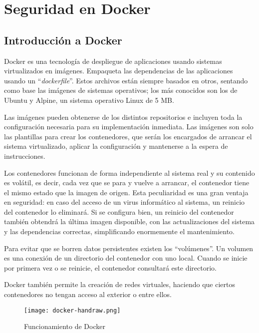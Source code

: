 \chapter{Seguridad en Docker}
\label{anexo:docker}
\section{Introducción a Docker}
Docker es una tecnología de despliegue de aplicaciones usando sistemas virtualizados en imágenes. Empaqueta las dependencias de las aplicaciones usando un \enquote{\textit{dockerfile}}. Estos archivos están siempre basados en otros, sentando como base las imágenes de sistemas operativos; los más conocidos son los de Ubuntu y Alpine, un sistema operativo Linux de 5 MB. 

Las imágenes pueden obtenerse de los distintos repositorios e incluyen toda la configuración necesaria para su implementación inmediata. Las imágenes son solo las plantillas para crear los contenedores, que serán los encargados de arrancar el sistema virtualizado, aplicar la configuración y mantenerse a la espera de instrucciones.

Los contenedores funcionan de forma independiente al sistema real y su contenido es volátil, es decir, cada vez que se para y vuelve a arrancar, el contenedor tiene el mismo estado que la imagen de origen. Esta peculiaridad es una gran ventaja en seguridad: en caso del acceso de un virus informático al sistema, un reinicio del contenedor lo eliminará. Si se configura bien, un reinicio del contenedor también obtendrá la última imagen disponible, con las actualizaciones del sistema y las dependencias correctas, simplificando enormemente el mantenimiento.

Para evitar que se borren datos persistentes existen los \enquote{volúmenes}. Un volumen es una conexión de un directorio del contenedor con uno local. Cuando se inicie por primera vez o se reinicie, el contenedor consultará este directorio.

Docker también permite la creación de redes virtuales, haciendo que ciertos contenedores no tengan acceso al exterior o entre ellos.

\begin{figure}[H]
  \centering
  \texttt{[image: docker-handraw.png]}
  \caption{Funcionamiento de Docker}
  \label{fig:Docker_explicacion}
\end{figure}

